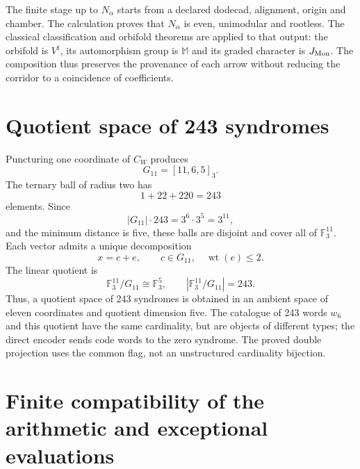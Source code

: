 The finite stage up to \(N_\alpha\) starts from a declared dodecad, alignment,
origin and chamber. The calculation proves that \(N_\alpha\) is even,
unimodular and rootless. The classical classification and orbifold theorems
are applied to that output: the orbifold is \(V^\natural\), its automorphism
group is \(\mathbb M\) and its graded character is \(J_{\rm Mon}\).
The composition thus preserves the provenance of each arrow without reducing the
corridor to a coincidence of coefficients.

\section{Quotient space of 243 syndromes}

Puncturing one coordinate of \(C_W\) produces
\[
G_{11}=[11,6,5]_3.
\]
The ternary ball of radius two has
\[
1+22+220=243
\]
elements. Since
\[
|G_{11}|\cdot243=3^6\cdot3^5=3^{11},
\]
and the minimum distance is five, these balls are disjoint and cover all of
\(\mathbb F_3^{11}\). Each vector admits a unique decomposition
\[
x=c+e,
\qquad
c\in G_{11},
\quad
\operatorname{wt}(e)\le2.
\]
The linear quotient is
\[
\mathbb F_3^{11}/G_{11}\cong\mathbb F_3^5,
\qquad
|\mathbb F_3^{11}/G_{11}|=243.
\]
Thus, a quotient space of 243 syndromes is obtained in an ambient space of eleven
coordinates and quotient dimension five. The catalogue of 243 words \(w_6\)
and this quotient have the same cardinality, but are objects of different types;
the direct encoder sends code words to the zero syndrome. The proved double projection
uses the common flag, not an unstructured cardinality
bijection.

\section{Finite compatibility of the arithmetic and exceptional evaluations}

